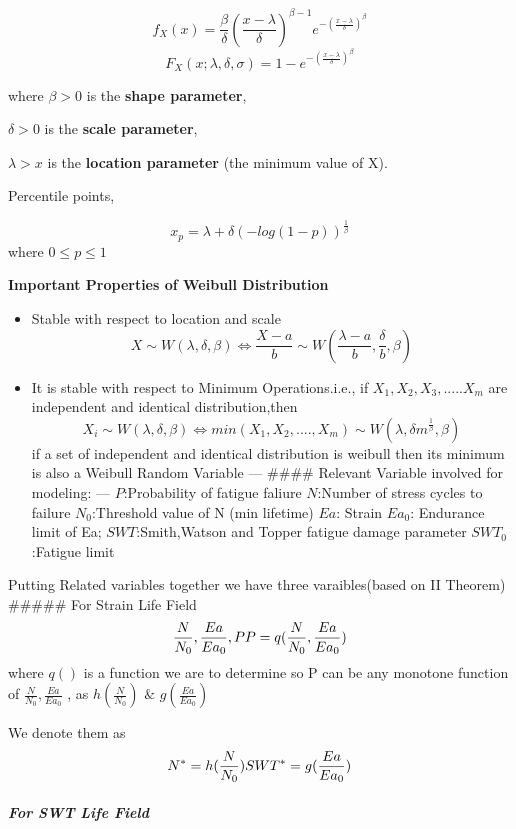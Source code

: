 \documentclass[11pt]{article}
\begin{document}
\[
f_X(x) = 
\frac{\beta}{\delta}(\frac{x-\lambda}{\delta})^{\beta-1}e^{-(\frac{x-\lambda}{\delta})^\beta}
\] \[
F_X(x;\lambda,\delta,\sigma) = 1-e^{-({\frac{x-\lambda}{\delta}})^\beta}
\]

where \(\beta > 0\) is the \textbf{shape parameter},

\(\delta > 0\) is the \textbf{scale parameter},

\(\lambda > x\) is the \textbf{location parameter} (the minimum value of
X).

Percentile points,

\[
x_p = \lambda + \delta(-log(1-p))^{\frac{1}{\beta}}
\] where \(0\leq p\leq 1\)

\textbf{Important Properties of Weibull Distribution}

\begin{itemize}
\item
  Stable with respect to location and scale \[
  X \sim W(\lambda,\delta,\beta) \iff \frac{X-a}{b} \sim W(\frac{\lambda-a}{b},\frac{\delta}{b},\beta)
  \]
\item
  It is stable with respect to Minimum Operations.i.e., if
  \(X_1,X_2,X_3,.....X_m\) are independent and identical
  distribution,then \[
  X_i\sim W(\lambda,\delta,\beta) \iff min(X_1,X_2,....,X_m) \sim W(\lambda,\delta m^{\frac{1}{\beta}},\beta)
  \] if a set of independent and identical distribution is weibull then
  its minimum is also a Weibull Random Variable --- \#\#\#\# Relevant
  Variable involved for modeling: --- \(P\):Probability of fatigue
  faliure \(N\):Number of stress cycles to failure \(N_0\):Threshold
  value of N (min lifetime) \(Ea\): Strain \(Ea_0\): Endurance limit of
  Ea; \(SWT\):Smith,Watson and Topper fatigue damage parameter
  \(SWT_0\):Fatigue limit
\end{itemize}

Putting Related variables together we have three varaibles(based on II
Theorem) \#\#\#\#\# For Strain Life Field \[
\frac{N}{N_0},\frac{Ea}{Ea_0},P \\
P = q(\frac{N}{N_0},\frac{Ea}{Ea_0})
\] where \(q()\) is a function we are to determine so P can be any
monotone function of \(\frac{N}{N_0},\frac{Ea}{Ea_0}\) , as
\(h(\frac{N}{N_0})\) \(\&\) \(g(\frac{Ea}{Ea_0})\)

We denote them as \[
N^* = h(\frac{N}{N_0}) \\
SWT^* = g(\frac{Ea}{Ea_0})
\]

\hypertarget{for-swt-life-field}{%
\subparagraph{For SWT Life Field}\label{for-swt-life-field}}
\end{document}
